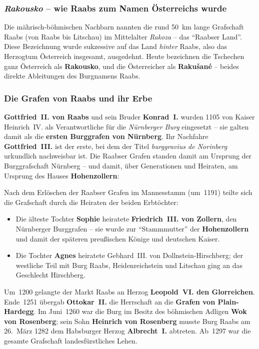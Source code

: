 \subsubsection{\textit{Rakousko} -- wie Raabs zum Namen Österreichs wurde}\label{raabs_rakousko}

Die mährisch-böhmischen Nachbarn nannten die rund 50~km lange Grafschaft Raabs (von Raabs bis Litschau) im Mittelalter \textit{Rakoza} -- das \enquote{Raabser Land}. Diese Bezeichnung wurde sukzessive auf das Land \textit{hinter} Raabs, also das Herzogtum Österreich insgesamt, ausgedehnt. Heute bezeichnen die Tschechen ganz Österreich als \textbf{Rakousko}, und die Österreicher als \textbf{Rakušané} -- beides direkte Ableitungen des Burgnamens Raabs. \cite[S.~54]{stenzel_burg_zu_burg}\cite{wiki_raabs,kacetl_thayatal}

\subsubsection{Die Grafen von Raabs und ihr Erbe}\label{grafen_von_raabs}

\textbf{Gottfried~II. von Raabs} und sein Bruder \textbf{Konrad~I.} wurden 1105 von Kaiser Heinrich~IV. als Verantwortliche für die \textit{Nürnberger Burg} eingesetzt -- sie galten damit als die \textbf{ersten Burggrafen von Nürnberg}. Ihr Nachfahre \textbf{Gottfried~III.} ist der erste, bei dem der Titel \textit{burggravius de Norinberg} urkundlich nachweisbar ist. Die Raabser Grafen standen damit am Ursprung der Burggrafschaft Nürnberg -- und damit, über Generationen und Heiraten, am Ursprung des Hauses \textbf{Hohenzollern}: \cite{hopf_raabs,wiki_raabs}

Nach dem Erlöschen der Raabser Grafen im Mannesstamm (um~1191) teilte sich die Grafschaft durch die Heiraten der beiden Erbtöchter:\begin{itemize}
  \item Die älteste Tochter \textbf{Sophie} heiratete \textbf{Friedrich~III. von Zollern}, den Nürnberger Burggrafen -- sie wurde zur \enquote{Stammmutter} der \textbf{Hohenzollern} und damit der späteren preußischen Könige und deutschen Kaiser.
  \item Die Tochter \textbf{Agnes} heiratete Gebhard~III. von Dollnstein-Hirschberg; der westliche Teil mit Burg Raabs, Heidenreichstein und Litschau ging an das Geschlecht Hirschberg.
\end{itemize}

Um~1200 gelangte der Markt Raabs an Herzog \textbf{Leopold~VI. den Glorreichen}. Ende~1251 übergab \textbf{Ottokar~II.} die Herrschaft an die \textbf{Grafen von Plain-Hardegg}. Im Juni~1260 war die Burg im Besitz des böhmischen Adligen \textbf{Wok von Rosenberg}; sein Sohn \textbf{Heinrich von Rosenberg} musste Burg Raabs am 26.~März 1282 dem Habsburger Herzog \textbf{Albrecht~I.} abtreten. Ab~1297 war die gesamte Grafschaft landesfürstliches Lehen. \cite{wiki_burg_raabs,hopf_raabs}

